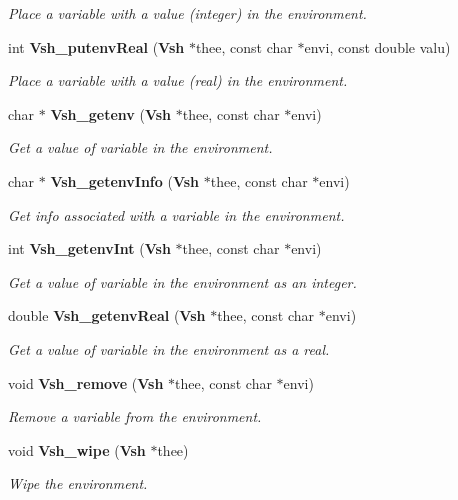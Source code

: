 \begin{DoxyCompactItemize}
\begin{DoxyCompactList}\small\item\em Place a variable with a value (integer) in the environment. \end{DoxyCompactList}\item 
int {\bf Vsh\+\_\+putenv\+Real} ({\bf Vsh} $\ast$thee, const char $\ast$envi, const double valu)
\begin{DoxyCompactList}\small\item\em Place a variable with a value (real) in the environment. \end{DoxyCompactList}\item 
char $\ast$ {\bf Vsh\+\_\+getenv} ({\bf Vsh} $\ast$thee, const char $\ast$envi)
\begin{DoxyCompactList}\small\item\em Get a value of variable in the environment. \end{DoxyCompactList}\item 
char $\ast$ {\bf Vsh\+\_\+getenv\+Info} ({\bf Vsh} $\ast$thee, const char $\ast$envi)
\begin{DoxyCompactList}\small\item\em Get info associated with a variable in the environment. \end{DoxyCompactList}\item 
int {\bf Vsh\+\_\+getenv\+Int} ({\bf Vsh} $\ast$thee, const char $\ast$envi)
\begin{DoxyCompactList}\small\item\em Get a value of variable in the environment as an integer. \end{DoxyCompactList}\item 
double {\bf Vsh\+\_\+getenv\+Real} ({\bf Vsh} $\ast$thee, const char $\ast$envi)
\begin{DoxyCompactList}\small\item\em Get a value of variable in the environment as a real. \end{DoxyCompactList}\item 
void {\bf Vsh\+\_\+remove} ({\bf Vsh} $\ast$thee, const char $\ast$envi)
\begin{DoxyCompactList}\small\item\em Remove a variable from the environment. \end{DoxyCompactList}\item 
void {\bf Vsh\+\_\+wipe} ({\bf Vsh} $\ast$thee)
\begin{DoxyCompactList}\small\item\em Wipe the environment. \end{DoxyCompactList}\item 

\end{DoxyCompactItemize}
